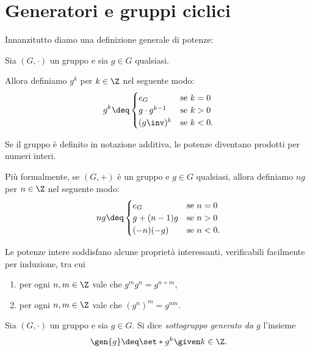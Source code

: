 \section{Generatori e gruppi ciclici}

Innanzitutto diamo una definizione generale di potenze:
\begin{definition} \label{def:potenze_intere}
    Sia $(G, \cdot)$ un gruppo e sia $g \in G$ qualsiasi. 
    
    Allora definiamo $g^k$ per $k \in \Z$ nel seguente modo: \[
        g^k \deq \begin{cases}
            e_G &\text{se } k = 0\\
            g \cdot g^{k-1} &\text{se } k > 0\\
            (g\inv)^k &\text{se } k < 0.
        \end{cases}    
    \]
\end{definition}

Se il gruppo è definito in notazione additiva, le potenze diventano prodotti per numeri interi. 

Più formalmente, se $(G, +)$ è un gruppo e $g \in G$ qualsiasi, allora definiamo $ng$ per $n \in \Z$ nel seguente modo: \[
    ng \deq \begin{cases}
        e_G &\text{se } n = 0\\
        g + (n-1)g &\text{se } n > 0\\
        (-n)(-g) &\text{se } n < 0.
    \end{cases}   
\]

Le potenze intere soddisfano alcune proprietà interessanti, verificabili facilmente per induzione, tra cui \begin{enumerate}[label={(P\arabic*)}, ref={(P\arabic*)}]
    \item per ogni $n, m \in \Z$ vale che $g^mg^n = g^{n+m}$,
    \item per ogni $n, m \in \Z$ vale che ${(g^n)}^m = g^{nm}$.
\end{enumerate}

\begin{definition}
     \label{def:sgr_generato}
    Sia $(G, \cdot)$ un gruppo e sia $g \in G$.
    Si dice \emph{sottogruppo generato da $g$} l'insieme \[
        \gen{g} \deq \set*{g^k \given k \in \Z}.    
    \]
\end{definition}

